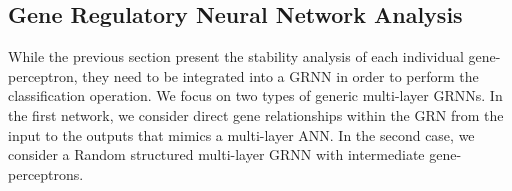 \documentclass[twocolumn]{biophys-new}
\newcommand{\adrian}[1]{\textcolor{blue}{#1}}
\begin{document}
{{%
\subsection*{Gene Regulatory Neural Network Analysis} \label{Network_ana}


While the previous section present the stability analysis of each individual gene-perceptron, they need to be integrated into a GRNN in order to perform the classification operation. We focus on two types of generic multi-layer  GRNNs. In the first network, we consider direct gene relationships within the GRN from the input to the outputs that mimics a multi-layer ANN. In the second case, we consider a Random structured multi-layer GRNN with intermediate gene-perceptrons. 


}}
\end{document}
